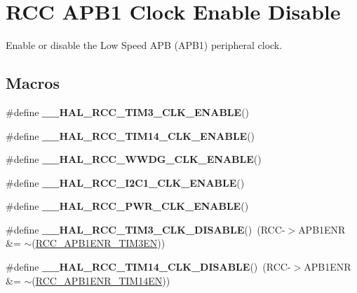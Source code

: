 \hypertarget{group___r_c_c___a_p_b1___clock___enable___disable}{}\section{R\+CC A\+P\+B1 Clock Enable Disable}
\label{group___r_c_c___a_p_b1___clock___enable___disable}


Enable or disable the Low Speed A\+PB (A\+P\+B1) peripheral clock.  


\subsection*{Macros}
\begin{DoxyCompactItemize}
\item 
\#define {\bfseries \+\_\+\+\_\+\+H\+A\+L\+\_\+\+R\+C\+C\+\_\+\+T\+I\+M3\+\_\+\+C\+L\+K\+\_\+\+E\+N\+A\+B\+LE}()
\item 
\#define {\bfseries \+\_\+\+\_\+\+H\+A\+L\+\_\+\+R\+C\+C\+\_\+\+T\+I\+M14\+\_\+\+C\+L\+K\+\_\+\+E\+N\+A\+B\+LE}()
\item 
\#define {\bfseries \+\_\+\+\_\+\+H\+A\+L\+\_\+\+R\+C\+C\+\_\+\+W\+W\+D\+G\+\_\+\+C\+L\+K\+\_\+\+E\+N\+A\+B\+LE}()
\item 
\#define {\bfseries \+\_\+\+\_\+\+H\+A\+L\+\_\+\+R\+C\+C\+\_\+\+I2\+C1\+\_\+\+C\+L\+K\+\_\+\+E\+N\+A\+B\+LE}()
\item 
\#define {\bfseries \+\_\+\+\_\+\+H\+A\+L\+\_\+\+R\+C\+C\+\_\+\+P\+W\+R\+\_\+\+C\+L\+K\+\_\+\+E\+N\+A\+B\+LE}()
\item 
\mbox{\label{group___r_c_c___a_p_b1___clock___enable___disable_ga9fb7035f007ec272b725e51018a36b23}} 
\#define {\bfseries \+\_\+\+\_\+\+H\+A\+L\+\_\+\+R\+C\+C\+\_\+\+T\+I\+M3\+\_\+\+C\+L\+K\+\_\+\+D\+I\+S\+A\+B\+LE}()~(R\+CC-\/$>$A\+P\+B1\+E\+NR \&= $\sim$(\hyperlink{group___peripheral___registers___bits___definition_ga75bfa33eb00ee30c6e22f7ceea464ac7}{R\+C\+C\+\_\+\+A\+P\+B1\+E\+N\+R\+\_\+\+T\+I\+M3\+EN}))
\item 
\mbox{\label{group___r_c_c___a_p_b1___clock___enable___disable_ga492911cce1e54350519e7793c897102b}} 
\#define {\bfseries \+\_\+\+\_\+\+H\+A\+L\+\_\+\+R\+C\+C\+\_\+\+T\+I\+M14\+\_\+\+C\+L\+K\+\_\+\+D\+I\+S\+A\+B\+LE}()~(R\+CC-\/$>$A\+P\+B1\+E\+NR \&= $\sim$(\hyperlink{group___peripheral___registers___bits___definition_gaca040bd66d4a54d4d9e9b261c8102799}{R\+C\+C\+\_\+\+A\+P\+B1\+E\+N\+R\+\_\+\+T\+I\+M14\+EN}))

\end{DoxyCompactItemize}

